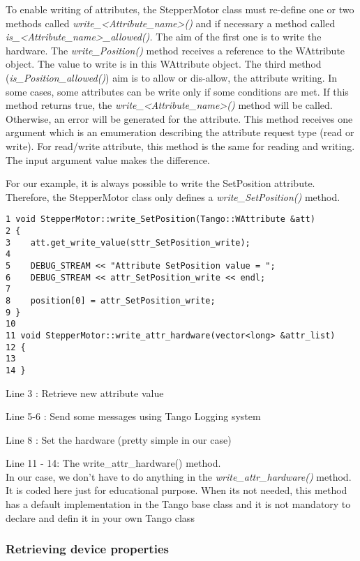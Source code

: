 To enable writing of attributes, the StepperMotor
class must re-define one or two methods called \emph{write\_<Attribute\_name>()}
and if necessary a method called \emph{is\_<Attribute\_name>\_allowed().}
The aim of the first one is to write the hardware. The \emph{write\_Position()}
method receives a reference to the WAttribute object. The value to
write is in this WAttribute object. The third method (\emph{is\_Position\_allowed()})
aim is to allow or dis-allow, the attribute writing. In some cases,
some attributes can be write only if some conditions are met. If this
method returns true, the \emph{write\_<Attribute\_name>()} method
will be called. Otherwise, an error will be generated for the attribute.
This method receives one argument which is an emumeration describing
the attribute request type (read or write). For read/write attribute,
this method is the same for reading and writing. The input argument
value makes the difference.

For our example, it is always possible to write the SetPosition attribute.
Therefore, the StepperMotor class only defines a \emph{write\_SetPosition()}
method.


\begin{verbatim}
1 void StepperMotor::write_SetPosition(Tango::WAttribute &att)
2 {
3    att.get_write_value(sttr_SetPosition_write);
4 
5    DEBUG_STREAM << "Attribute SetPosition value = ";
6    DEBUG_STREAM << attr_SetPosition_write << endl;
7 
8    position[0] = attr_SetPosition_write;
9 }
10 
11 void StepperMotor::write_attr_hardware(vector<long> &attr_list)
12 {
13 
14 }
\end{verbatim}


Line 3 : Retrieve new attribute value

Line 5-6 : Send some messages using Tango Logging system

Line 8 : Set the hardware (pretty simple in our case)

Line 11 - 14: The write\_attr\_hardware() method. \\


In our case, we don't have to do anything in the \emph{write\_attr\_hardware()}
method. It is coded here just for educational purpose. When its not
needed, this method has a default implementation in the Tango base
class and it is not mandatory to declare and defin it in your own
Tango class


\subsubsection{Retrieving device properties}

